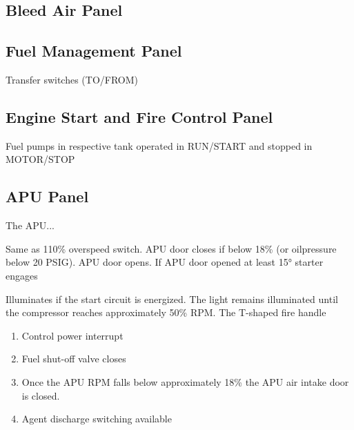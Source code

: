 \subsection{Bleed Air Panel}
\label{sec:bleed-air-panel}

\begin{enumerate}
\end{enumerate}

\subsection{Fuel Management Panel}

Transfer switches (TO/FROM)

\subsection{Engine Start and Fire Control Panel}
\label{sec:eng-panel}

\begin{enumerate}
    \begin{itemize}
    \end{itemize}
    Fuel pumps in respective tank operated in RUN/START and stopped in MOTOR/STOP
\end{enumerate}

\subsection{APU Panel}
\label{sec:apu-panel}

The \gls{APU}...

\begin{enumerate}
    \begin{itemize}
       Same as 110\% overspeed switch. APU door closes if below 18\% (or oilpressure below 20 PSIG).
       APU door opens.
       If APU door opened at least 15° starter engages
    \end{itemize}
   Illuminates if the start circuit is energized. The light remains illuminated until the compressor reaches approximately 50\% \gls{RPM}.
   The T-shaped fire handle
    \begin{enumerate}
      \item Control power interrupt
      \item Fuel shut-off valve closes
      \item Once the APU \gls{RPM} falls below approximately 18\% the APU air intake door is closed.
      \item Agent discharge switching available
    \end{enumerate}
\end{enumerate}

